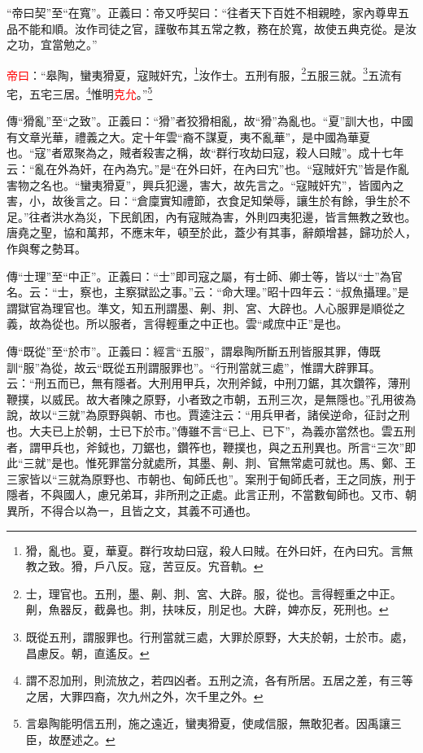 {\noindent\shu{}\fzkt “帝曰契”至“在寬”。正義曰：帝又呼契曰：“往者天下百姓不相親睦，家內尊卑五品不能和順。汝作司徒之官，謹敬布其五常之教，務在於寬，故使五典克從。是汝之功，宜當勉之。” \par}

\textcolor{red}{帝曰}：“皋陶，蠻夷猾夏，寇賊奸宄，\footnote{猾，亂也。夏，華夏。群行攻劫曰寇，殺人曰賊。在外曰奸，在內曰宄。言無教之致。猾，戶八反。寇，苦豆反。宄音軌。}汝作士。五刑有服，\footnote{士，理官也。五刑，墨、劓、剕、宮、大辟。服，從也。言得輕重之中正。劓，魚器反，截鼻也。剕，扶味反，刖足也。大辟，婢亦反，死刑也。}五服三就。\footnote{既從五刑，謂服罪也。行刑當就三處，大罪於原野，大夫於朝，士於市。處，昌慮反。朝，直遙反。}五流有宅，五宅三居。\footnote{謂不忍加刑，則流放之，若四凶者。五刑之流，各有所居。五居之差，有三等之居，大罪四裔，次九州之外，次千里之外。}惟明\textcolor{red}{克允}。”\footnote{言皋陶能明信五刑，施之遠近，蠻夷猾夏，使咸信服，無敢犯者。因禹讓三臣，故歷述之。}

{\noindent\zhuan{}\fzbyks 傳“猾亂”至“之致”。正義曰：“猾”者狡猾相亂，故“猾”為亂也。“夏”訓大也，中國有文章光華，禮義之大。定十年雲“裔不謀夏，夷不亂華”，是中國為華夏也。“寇”者眾聚為之，賊者殺害之稱，故“群行攻劫曰寇，殺人曰賊”。成十七年云：“亂在外為奸，在內為宄。”是“在外曰奸，在內曰宄”也。“寇賊奸宄”皆是作亂害物之名也。“蠻夷猾夏”，興兵犯邊，害大，故先言之。“寇賊奸宄”，皆國內之害，小，故後言之。曰：“倉廩實知禮節，衣食足知榮辱，讓生於有餘，爭生於不足。”往者洪水為災，下民飢困，內有寇賊為害，外則四夷犯邊，皆言無教之致也。唐堯之聖，協和萬邦，不應末年，頓至於此，蓋少有其事，辭頗增甚，歸功於人，作與奪之勢耳。 \par}

{\noindent\zhuan{}\fzbyks 傳“士理”至“中正”。正義曰：“士”即司寇之屬，有士師、卿士等，皆以“士”為官名。云：“士，察也，主察獄訟之事。”云：“命大理。”昭十四年云：“叔魚攝理。”是謂獄官為理官也。準文，知五刑謂墨、劓、剕、宮、大辟也。人心服罪是順從之義，故為從也。所以服者，言得輕重之中正也。雲“咸庶中正”是也。 \par}

{\noindent\zhuan{}\fzbyks 傳“既從”至“於市”。正義曰：經言“五服”，謂皋陶所斷五刑皆服其罪，傳既訓“服”為從，故云“既從五刑謂服罪也”。“行刑當就三處”，惟謂大辟罪耳。云：“刑五而已，無有隱者。大刑用甲兵，次刑斧鉞，中刑刀鋸，其次鑽筰，薄刑鞭撲，以威民。故大者陳之原野，小者致之市朝，五刑三次，是無隱也。”孔用彼為說，故以“三就”為原野與朝、市也。賈逵注云：“用兵甲者，諸侯逆命，征討之刑也。大夫已上於朝，士已下於市。”傳雖不言“已上、已下”，為義亦當然也。雲五刑者，謂甲兵也，斧鉞也，刀鋸也，鑽筰也，鞭撲也，與之五刑異也。所言“三次”即此“三就”是也。惟死罪當分就處所，其墨、劓、剕、官無常處可就也。馬、鄭、王三家皆以“三就為原野也、市朝也、甸師氏也”。案刑于甸師氏者，王之同族，刑于隱者，不與國人，慮兄弟耳，非所刑之正處。此言正刑，不當數甸師也。又市、朝異所，不得合以為一，且皆之文，其義不可通也。 \par}

